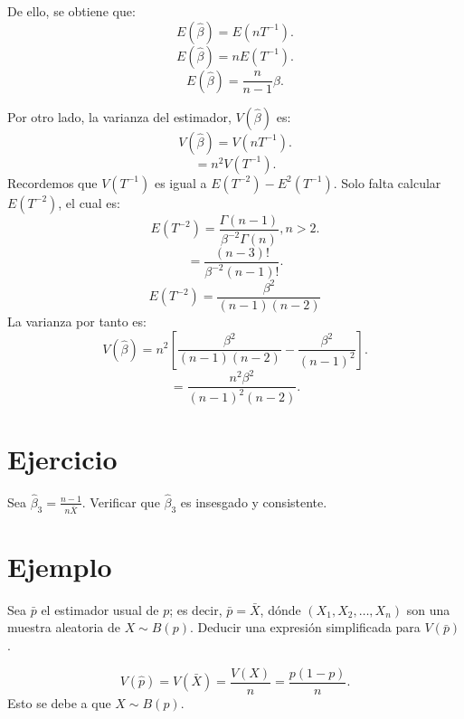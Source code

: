 \documentclass{article}
\begin{document}
De ello, se obtiene que:
\[ E(\hat{\beta})=E(nT^{-1}).\]
\[ E(\hat{\beta})=n E(T^{-1}).\]
\[ E(\hat{\beta})=\frac{n}{n-1} \beta.\]

Por otro lado, la varianza del estimador, $V(\hat{\beta})$ es:
\[ V(\hat{\beta})=V(nT^{-1}).\]
\[ =n^{2}V(T^{-1}).\]
Recordemos que $V(T^{-1})$ es igual a $E(T^{-2})-E^{2}(T^{-1})$. Solo falta calcular $E(T^{-2})$, el cual es:
\[ E(T^{-2})=\frac{\Gamma(n-1)}{\beta^{-2}\Gamma(n)}, n>2.\]
\[=\frac{(n-3)!}{\beta^{-2}(n-1)!}.\]
\begin{equation}
	E(T^{-2})=\frac{\beta^{2}}{(n-1)(n-2)}
\end{equation}
La varianza por tanto es:
\[ V(\hat{\beta})=n^{2}[\frac{\beta^{2}}{(n-1)(n-2)}-\frac{\beta^{2}}{{(n-1)}^{2}}].\]
\[ =\frac{n^{2}\beta^{2}}{{(n-1)}^{2}(n-2)}.\]
\section{Ejercicio}
Sea $\hat{\beta}_{3}=\frac{n-1}{n\bar{X}}$. Verificar que $\hat{\beta}_{3}$ es insesgado y consistente.
\section{Ejemplo}
Sea $\bar{p}$ el estimador usual de $p$; es decir, $\bar{p}=\bar{X}$, dónde $(X_{1},X_{2},\ldots,X_{n})$ son una muestra aleatoria de $X \sim B(p)$. Deducir una expresión simplificada para $V(\bar{p})$.

\[ V(\hat{p})=V(\bar{X})=\frac{V(X)}{n}= \frac{p(1-p)}{n}.\]
Esto se debe a que $X \sim  B(p)$.
\end{document}
